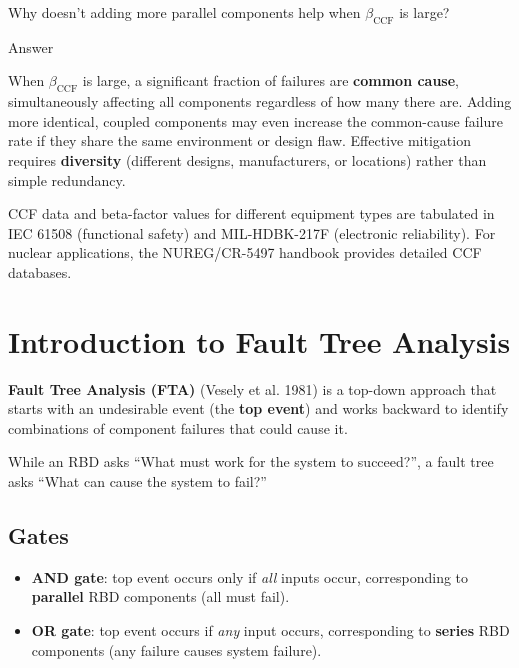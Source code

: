 \documentclass[
  letterpaper,
  DIV=11,
  numbers=noendperiod]{scrreprt}
\providecommand{\tightlist}{%
  \setlength{\itemsep}{0pt}\setlength{\parskip}{0pt}}
\begin{document}
\begin{tcolorbox}[enhanced jigsaw, arc=.35mm, bottomrule=.15mm, bottomtitle=1mm, breakable, colback=white, colbacktitle=quarto-callout-tip-color!10!white, colframe=quarto-callout-tip-color-frame, coltitle=black, left=2mm, leftrule=.75mm, opacityback=0, opacitybacktitle=0.6, rightrule=.15mm, title=\textcolor{quarto-callout-tip-color}{\faLightbulb}\hspace{0.5em}{Review}, titlerule=0mm, toprule=.15mm, toptitle=1mm]

Why doesn't adding more parallel components help when
\(\beta_{\text{CCF}}\) is large?

Answer

When \(\beta_{\text{CCF}}\) is large, a significant fraction of failures
are \textbf{common cause}, simultaneously affecting all components
regardless of how many there are. Adding more identical, coupled
components may even increase the common-cause failure rate if they share
the same environment or design flaw. Effective mitigation requires
\textbf{diversity} (different designs, manufacturers, or locations)
rather than simple redundancy.

\end{tcolorbox}

CCF data and beta-factor values for different equipment types are
tabulated in IEC 61508 (functional safety) and MIL-HDBK-217F (electronic
reliability). For nuclear applications, the NUREG/CR-5497 handbook
provides detailed CCF databases.

\section{Introduction to Fault Tree
Analysis}\label{introduction-to-fault-tree-analysis}

\textbf{Fault Tree Analysis (FTA)} (Vesely et al. 1981) is a top-down
approach that starts with an undesirable event (the \textbf{top event})
and works backward to identify combinations of component failures that
could cause it.

While an RBD asks ``What must work for the system to succeed?'', a fault
tree asks ``What can cause the system to fail?''

\subsection{Gates}\label{gates}

\begin{itemize}
\tightlist
\item
  \textbf{AND gate}: top event occurs only if \emph{all} inputs occur,
  corresponding to \textbf{parallel} RBD components (all must fail).
\item
  \textbf{OR gate}: top event occurs if \emph{any} input occurs,
  corresponding to \textbf{series} RBD components (any failure causes
  system failure).
\end{itemize}
\end{document}
